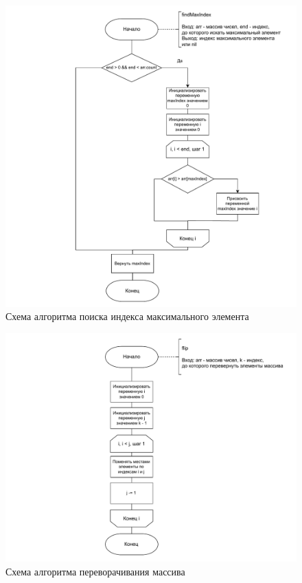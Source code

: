 \begin{figure}[h]
	\centering
	\includegraphics[width=1\linewidth]{img/findMaxIndex.pdf}
	\caption{Схема алгоритма поиска индекса максимального элемента}
	\label{img:findMaxIndex}
\end{figure}

\begin{figure}[h]
	\centering
	\includegraphics[width=1\linewidth]{img/flip.pdf}
	\caption{Схема алгоритма переворачивания массива}
	\label{img:flip}
\end{figure}

